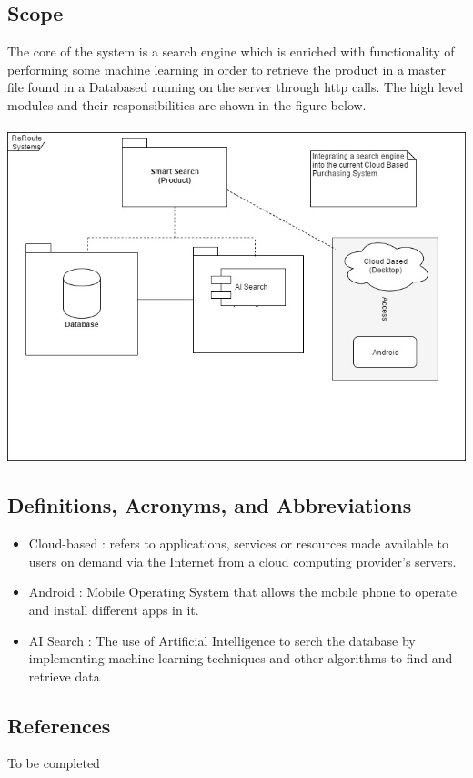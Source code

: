 \documentclass[a4paper,10pt]{article}
\begin{document}
	\subsection{Scope} 
	The core of the system is a search engine which is enriched with functionality
of performing some machine learning in order to retrieve the product in a master file found in a Databased running on the server through http calls. The high level modules and their responsibilities are shown in the figure below. \\ \\
	\includegraphics[scale=0.62]{scope1.jpg}
	\subsection{Definitions, Acronyms, and Abbreviations} 

	\begin{itemize} 
	\item Cloud-based : refers to applications, services or resources made available to users on demand via the Internet from a cloud computing provider's servers.
	\item Android : Mobile Operating System that allows the mobile phone to operate and install different apps in it.
	\item AI Search : The use of Artificial Intelligence to serch the database by implementing machine learning techniques and other algorithms to find and retrieve data
	\end{itemize}
	\subsection{References} 
		To be completed 
\end{document}

